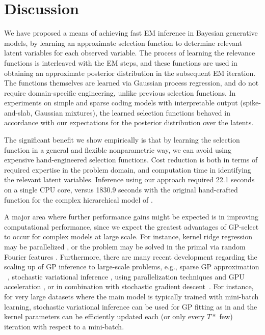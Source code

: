
\section{Discussion}
\label{disc}
%
We have proposed a means of achieving fast EM inference in Bayesian generative models, by
learning an approximate selection function to determine relevant latent variables
for each observed variable. The process of learning the relevance functions
is interleaved with the EM steps, and these functions
are used in obtaining an approximate posterior distribution in the subsequent EM iteration.
The functions themselves are learned via Gaussian process regression,
and do not require domain-specific engineering, unlike previous selection functions.
In experiments on simple and sparse coding models with interpretable output (spike-and-slab, Gaussian mixtures),
the learned selection functions behaved in accordance with our expectations for the posterior
distribution over the latents.  

The significant benefit we show empirically is that by learning the selection function in a general and flexible nonparametric way, we can avoid using expensive hand-engineered selection functions.
Cost reduction is both in terms of required expertise in the problem domain, and computation time in identifying the relevant latent variables.
Inference using our approach required 22.1 seconds on a single CPU core, versus  1830.9 seconds with the original hand-crafted function 
for the complex hierarchical model of \citep{DaiLucke2014}.

A major area where further performance gains might be expected is in
improving computational performance, since we expect the greatest
advantages of GP-select to occur for complex models at large scale. For instance,
 kernel ridge regression may be parallelized \citep{zhang14divide},
or the problem may be solved in the primal via random Fourier features \citep{LeSarSmo13}.
Furthermore, there are many recent development regarding the scaling up of GP inference to large-scale problems, e.g., sparse GP approximation
~\citep{sparseGP}, stochastic variational inference \citep{HensmanEtAl2013,Hensman2012}, using parallelization techniques and GPU acceleration \citep{butt}, or in combination with stochastic gradient descent~\cite{Bottou08thetradeoffs}. 
For instance, for very large datasets where the main model is typically trained with mini-batch learning, stochastic variational inference can be used for GP fitting as in \citep{HensmanEtAl2013} and the kernel parameters can be efficiently updated each (or only every $T*$ few) iteration with respect to a mini-batch.



